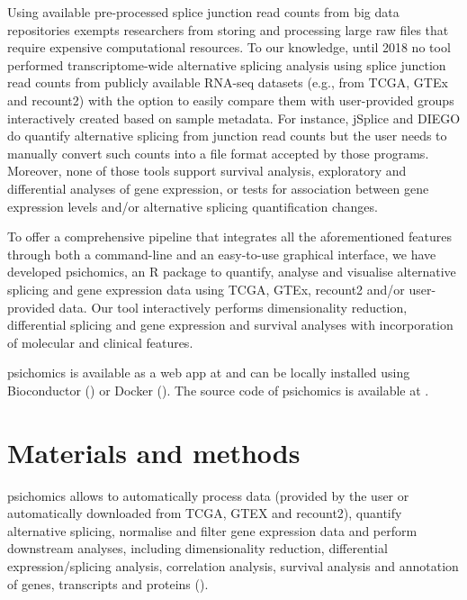 Using available pre-processed splice junction read counts from big data repositories exempts researchers from storing and processing large raw files that require expensive computational resources. To our knowledge, until 2018 no tool performed transcriptome-wide alternative splicing analysis using splice junction read counts from publicly available RNA-seq datasets (e.g., from TCGA, GTEx and recount2) with the option to easily compare them with user-provided groups interactively created based on sample metadata. For instance, jSplice \cite{christinat:2016ui} and DIEGO \cite{doose:2018uv} do quantify alternative splicing from junction read counts but the user needs to manually convert such counts into a file format accepted by those programs. Moreover, none of those tools support survival analysis, exploratory and differential analyses of gene expression, or tests for association between gene expression levels and/or alternative splicing quantification changes.

To offer a comprehensive pipeline that integrates all the aforementioned features through both a command-line and an easy-to-use graphical interface, we have developed psichomics, an R package to quantify, analyse and visualise alternative splicing and gene expression data using TCGA, GTEx, recount2 and/or user-provided data. Our tool interactively performs dimensionality reduction, differential splicing and gene expression and survival analyses with incorporation of molecular and clinical features.


psichomics is available as a web app at  and can be locally installed using Bioconductor () or Docker (). The source code of psichomics is available at .

\section{Materials and methods}

psichomics allows to automatically process data (provided by the user or automatically downloaded from TCGA, GTEX and recount2), quantify alternative splicing, normalise and filter gene expression data and perform downstream analyses, including dimensionality reduction, differential expression/splicing analysis, correlation analysis, survival analysis and annotation of genes, transcripts and proteins ().

